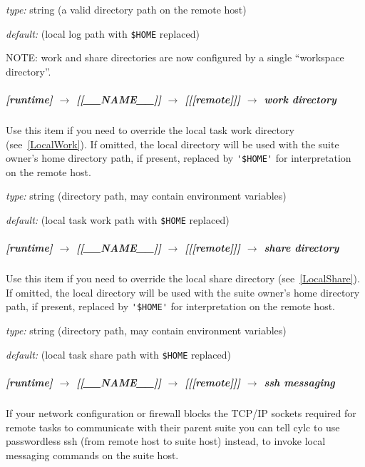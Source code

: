 \begin{myitemize}
\item {\em type:} string (a valid directory path on the remote host)
\item {\em default:} (local log path with \lstinline=$HOME= replaced)
\end{myitemize}
 
NOTE: work and share directories are now configured by a single ``workspace directory''.

\subparagraph[work directory]{[runtime] $\rightarrow$ [[\_\_NAME\_\_]] $\rightarrow$ [[[remote]]] $\rightarrow$ work directory}

Use this item if you need to override the local task work directory 
(see~\ref{LocalWork}). If omitted, the local directory will be used with
the suite owner's home directory path, if present,
replaced by \lstinline='$HOME'= for interpretation on 
the remote host.

\begin{myitemize}
\item {\em type:} string (directory path, may contain environment variables)
\item {\em default:} (local task work path with \lstinline=$HOME= replaced)
\end{myitemize}

\subparagraph[share directory]{[runtime] $\rightarrow$ [[\_\_NAME\_\_]] $\rightarrow$ [[[remote]]] $\rightarrow$ share directory}

Use this item if you need to override the local share directory 
(see~\ref{LocalShare}). If omitted, the local directory will be used
with the suite owner's home directory path, if present, replaced by
\lstinline='$HOME'= for interpretation on the remote host.

\begin{myitemize}
\item {\em type:} string (directory path, may contain environment variables)
\item {\em default:} (local task share path with \lstinline=$HOME= replaced)
\end{myitemize}

\subparagraph[ssh messaging]{[runtime] $\rightarrow$ [[\_\_NAME\_\_]] $\rightarrow$ [[[remote]]] $\rightarrow$ ssh messaging}

If your network configuration or firewall blocks the TCP/IP sockets
required for remote tasks to communicate with their parent suite
you can tell cylc to use passwordless ssh (from remote host to suite
host) instead, to invoke local messaging commands on the suite host.


